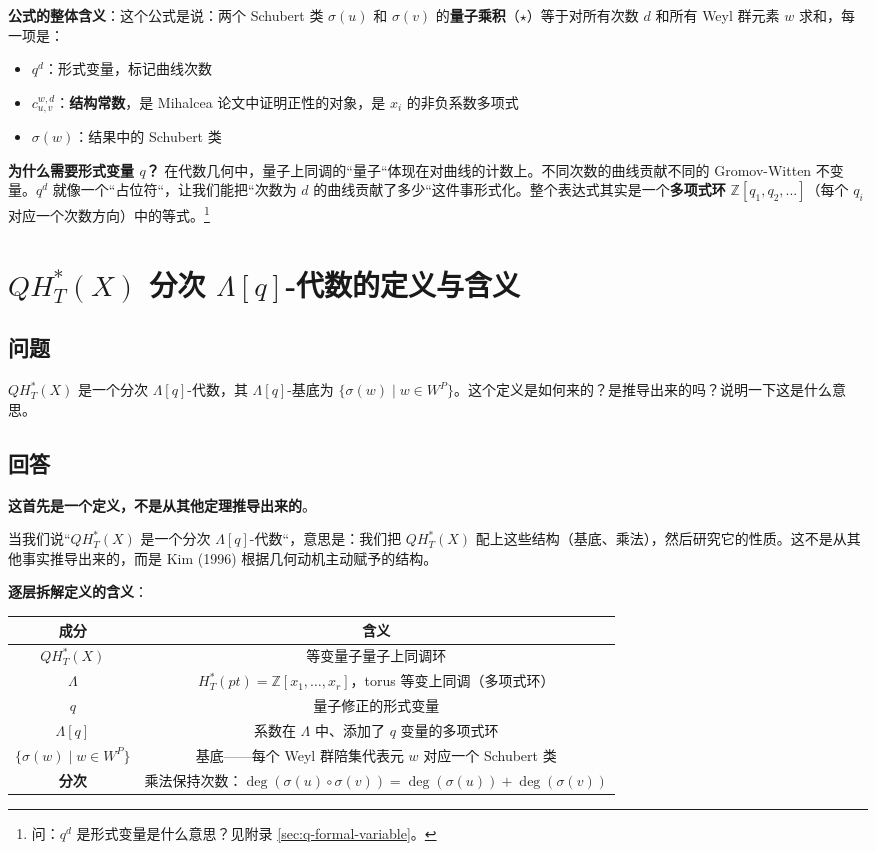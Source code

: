 \textbf{公式的整体含义}：这个公式是说：两个 Schubert 类 $\sigma(u)$ 和 $\sigma(v)$ 的\textbf{量子乘积}（$\star$）等于对所有次数 $d$ 和所有 Weyl 群元素 $w$ 求和，每一项是：
\begin{itemize}
\item $q^d$：形式变量，标记曲线次数
\item $c_{u,v}^{w,d}$：\textbf{结构常数}，是 Mihalcea 论文中证明正性的对象，是 $x_i$ 的非负系数多项式
\item $\sigma(w)$：结果中的 Schubert 类
\end{itemize}

\textbf{为什么需要形式变量 $q$？} 在代数几何中，量子上同调的``量子``体现在对曲线的计数上。不同次数的曲线贡献不同的 Gromov-Witten 不变量。$q^d$ 就像一个``占位符``，让我们能把``次数为 $d$ 的曲线贡献了多少``这件事形式化。整个表达式其实是一个\textbf{多项式环} $\mathbb{Z}[q_1, q_2, ...]$（每个 $q_i$ 对应一个次数方向）中的等式。\footnote{问：$q^d$ 是形式变量是什么意思？见附录 \cref{sec:q-formal-variable}。}
\section{$QH_T^*(X)$ 分次 $\Lambda[q]$-代数的定义与含义}\label{sec:QH-T-graded-Lambda}
\subsection{问题}
$QH_T^*(X)$ 是一个分次 $\Lambda[q]$-代数，其 $\Lambda[q]$-基底为 $\{\sigma(w) \mid w \in W^P\}$。这个定义是如何来的？是推导出来的吗？说明一下这是什么意思。
\subsection{回答}
\textbf{这首先是一个定义，不是从其他定理推导出来的}。

当我们说``$QH_T^*(X)$ 是一个分次 $\Lambda[q]$-代数``，意思是：我们把 $QH_T^*(X)$ 配上这些结构（基底、乘法），然后研究它的性质。这不是从其他事实推导出来的，而是 Kim (1996) 根据几何动机主动赋予的结构。

\textbf{逐层拆解定义的含义}：

\begin{center}
\begin{tabular}{|c|c|}
\hline
成分 & 含义 \\
\hline
$QH_T^*(X)$ & 等变量子量子上同调环 \\
\hline
$\Lambda$ & $H_T^*(pt) = \mathbb{Z}[x_1,\ldots,x_r]$，torus 等变上同调（多项式环） \\
\hline
$q$ & 量子修正的形式变量 \\
\hline
$\Lambda[q]$ & 系数在 $\Lambda$ 中、添加了 $q$ 变量的多项式环 \\
\hline
$\{\sigma(w) \mid w \in W^P\}$ & 基底——每个 Weyl 群陪集代表元 $w$ 对应一个 Schubert 类 \\
\hline
\textbf{分次} & 乘法保持次数：$\deg(\sigma(u) \circ \sigma(v)) = \deg(\sigma(u)) + \deg(\sigma(v))$ \\
\hline
\end{tabular}
\end{center}

